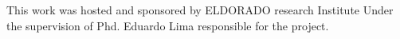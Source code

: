 







This work was hosted and sponsored by ELDORADO research Institute
Under the supervision of Phd. Eduardo Lima responsible for the project.



